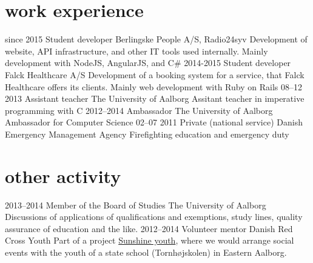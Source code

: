 \documentclass[]{friggeri-cv}
\begin{document}
\section{work experience}

\begin{entrylist}
  \entry
    {since 2015}
    {Student developer}
    {Berlingske People A/S, Radio24syv}
    {Development of website, API infrastructure, and other IT tools used internally. Mainly development with NodeJS, AngularJS, and C\#}
  \entry
    {2014-2015}
    {Student developer}
    {Falck Healthcare A/S}
    {Development of a booking system for a service, that Falck Healthcare offers its clients. Mainly web development with Ruby on Rails}
  \entry
    {08–12 2013}
    {Assistant teacher}
    {The University of Aalborg}
    {Assitant teacher in imperative programming with C}
  \entry
    {2012–2014}
    {Ambassador}
    {The University of Aalborg}
    {Ambassador for Computer Science}
  \entry
    {02–07 2011}
    {Private (national service)}
    {Danish Emergency Management Agency}
    {Firefighting education and emergency duty}
\end{entrylist}

\section{other activity}

\begin{entrylist}
  \entry
    {2013–2014}
    {Member of the Board of Studies}
    {The University of Aalborg}
    {Discussions of applications of qualifications and exemptions, study lines, quality assurance of education and the like.}
  \entry
    {2012–2014}
    {Volunteer mentor}
    {Danish Red Cross Youth}
    {Part of a project \href{http://www.urk.dk/solskinsunge/}{Sunshine youth}, where we would arrange social events with the youth of a state school (Tornhøjskolen) in Eastern Aalborg.}
\end{entrylist}
\end{document}
